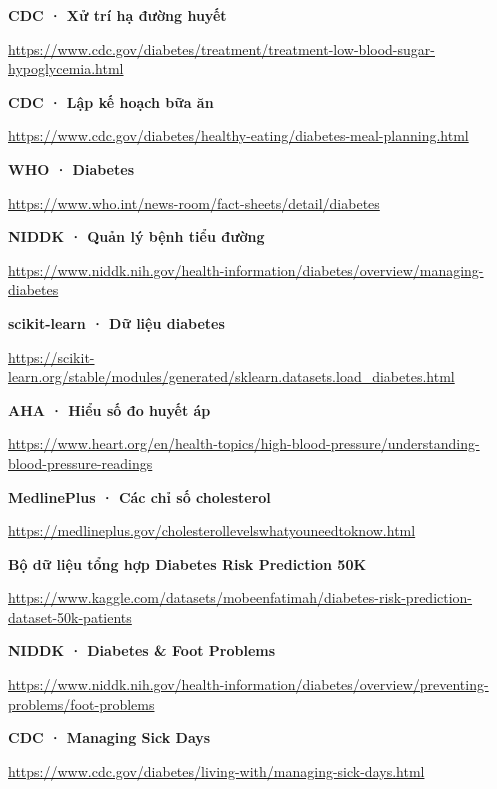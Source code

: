 \noindent\textbf{CDC · Xử trí hạ đường huyết}\par\noindent\url{https://www.cdc.gov/diabetes/treatment/treatment-low-blood-sugar-hypoglycemia.html}\par\medskip

\noindent\textbf{CDC · Lập kế hoạch bữa ăn}\par\noindent\url{https://www.cdc.gov/diabetes/healthy-eating/diabetes-meal-planning.html}\par\medskip

\noindent\textbf{WHO · Diabetes}\par\noindent\url{https://www.who.int/news-room/fact-sheets/detail/diabetes}\par\medskip

\noindent\textbf{NIDDK · Quản lý bệnh tiểu đường}\par\noindent\url{https://www.niddk.nih.gov/health-information/diabetes/overview/managing-diabetes}\par\medskip

\noindent\textbf{scikit-learn · Dữ liệu diabetes}\par\noindent\url{https://scikit-learn.org/stable/modules/generated/sklearn.datasets.load_diabetes.html}\par\medskip

\noindent\textbf{AHA · Hiểu số đo huyết áp}\par\noindent\url{https://www.heart.org/en/health-topics/high-blood-pressure/understanding-blood-pressure-readings}\par\medskip

\noindent\textbf{MedlinePlus · Các chỉ số cholesterol}\par\noindent\url{https://medlineplus.gov/cholesterollevelswhatyouneedtoknow.html}\par\medskip

\noindent\textbf{Bộ dữ liệu tổng hợp Diabetes Risk Prediction 50K}\par\noindent\url{https://www.kaggle.com/datasets/mobeenfatimah/diabetes-risk-prediction-dataset-50k-patients}\par\medskip

\noindent\textbf{NIDDK · Diabetes \& Foot Problems}\par\noindent\url{https://www.niddk.nih.gov/health-information/diabetes/overview/preventing-problems/foot-problems}\par\medskip

\noindent\textbf{CDC · Managing Sick Days}\par\noindent\url{https://www.cdc.gov/diabetes/living-with/managing-sick-days.html}\par\medskip

